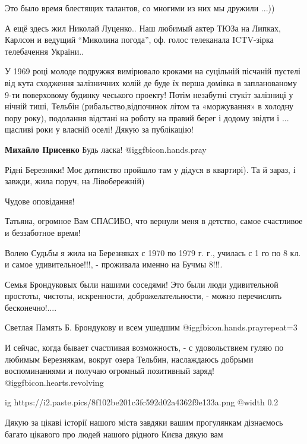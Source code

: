 \begin{itemize}
Это было время блестящих талантов, со многими из них мы дружили ...))


А ещё здесь жил Николай Луценко.. Наш любимый актер ТЮЗа на Липках, Карлсон и
ведущий \enquote{Миколина погода}, оф. голос телеканала ICTV-зірка телебачення України..


У 1969 році молоде подружжя вимірювало кроками на суцільній пісчаній пустелі
від кута сходження залізничних колій де буде їх перша домівка в запланованому
9-ти поверховому будинку чеського проекту! Потім незабутні стукіт залізниці у
нічній тиші, Тельбін (рибальство,відпочинок літом та «моржування» в холодну
пору року), подолання відстані на роботу на правий берег і додому звідти і ...
щасливі роки у власній оселі! Дякую за публікацію!

\textbf{Михайло Присенко} Будь ласка! @igg{fbicon.hands.pray} 


Рідні Березняки! Моє дитинство пройшло там у дідуся в квартирі). Та й зараз, і
завжди, жила поруч, на Лівобережній)

Чудове оповідання!


Татьяна, огромное Вам СПАСИБО, что вернули меня в детство, самое счастливое и
беззаботное время!

Волею Судьбы я жила на Березняках с 1970 по 1979 г. г., училась с 1 го по 8 кл. и
самое удивительное!!!, - проживала именно на Бучмы 8!!!.

Семья Брондуковых были нашими соседями! Это были люди удивительной
простоты, чистоты, искренности, доброжелательности, - можно перечислять
бесконечно!....

Светлая Память Б. Брондукову и всем ушедшим @igg{fbicon.hands.pray}{repeat=3} 

И сейчас, когда бывает счастливая возможность, - с удовольствием гуляю по любимым
Березнякам, вокруг озера Тельбин, наслаждаюсь добрыми воспоминаниями и получаю
огромный позитивный заряд! @igg{fbicon.hearts.revolving} 

\ifcmt
  ig https://i2.paste.pics/8f102be201c3fc592d02a4362f9e133a.png
  @width 0.2
\fi


Дякую за цікаві історії нашого міста завдяки вашим прогулянкам дізнаємось
багато цікавого про людей нашого рідного Києва дякую вам


\end{itemize}
